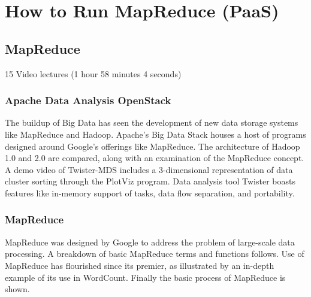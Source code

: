 \part{How to Run MapReduce (PaaS)}
\label{sec:icloud-mapreduce}

\chapter{MapReduce}

\FILENAME

15 Video lectures (1 hour 58 minutes 4 seconds)

\section{Apache Data Analysis OpenStack}

The buildup of Big Data has seen the development of new data storage
systems like MapReduce and Hadoop. Apache's Big Data Stack houses a host
of programs designed around Google's offerings like MapReduce. The
architecture of Hadoop 1.0 and 2.0 are compared, along with an
examination of the MapReduce concept. A demo video of Twister-MDS
includes a 3-dimensional representation of data cluster sorting through
the PlotViz program. Data analysis tool Twister boasts features like
in-memory support of tasks, data flow separation, and portability.




\section{MapReduce}

MapReduce was designed by Google to address the problem of large-scale
data processing. A breakdown of basic MapReduce terms and functions
follows. Use of MapReduce has flourished since its premier, as
illustrated by an in-depth example of its use in WordCount. Finally the
basic process of MapReduce is shown.


